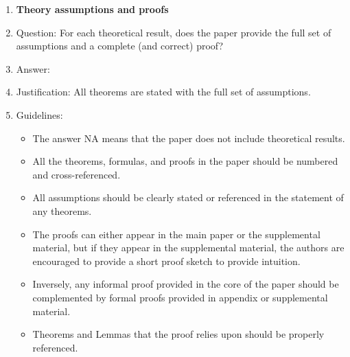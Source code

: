 \documentclass{article}
\theoremstyle{plain}
\begin{document}
\begin{enumerate}
\item {\bf Theory assumptions and proofs}
    \item[] Question: For each theoretical result, does the paper provide the full set of assumptions and a complete (and correct) proof?
    \item[] Answer: 
    \answerYes{}
    \item[] Justification: All theorems are stated with the full set of assumptions.
    \item[] Guidelines:
    \begin{itemize}
        \item The answer NA means that the paper does not include theoretical results. 
        \item All the theorems, formulas, and proofs in the paper should be numbered and cross-referenced.
        \item All assumptions should be clearly stated or referenced in the statement of any theorems.
        \item The proofs can either appear in the main paper or the supplemental material, but if they appear in the supplemental material, the authors are encouraged to provide a short proof sketch to provide intuition. 
        \item Inversely, any informal proof provided in the core of the paper should be complemented by formal proofs provided in appendix or supplemental material.
        \item Theorems and Lemmas that the proof relies upon should be properly referenced. 
    \end{itemize}


\end{enumerate}
\end{document}
